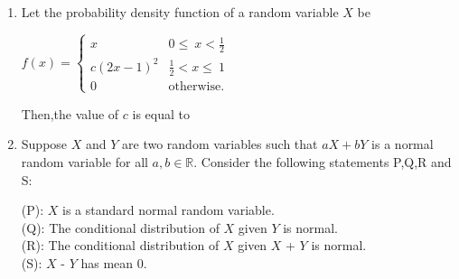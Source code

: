 \documentclass[journal,12pt,twocolumn]{IEEEtran}
\begin{document}
\begin{enumerate}
%
%
%
%
%
%
%
%

\item Let the probability density function of a random variable $X$ be 
\begin{center}
$ 
f(x)=
\begin{cases}
x & 0\leq\ x< \frac{1}{2}\\
c(2x-1)^2 &  \frac{1}{2}<x\leq\ 1\\
0 & \text{otherwise}.
\end{cases}
$\\ 
\end{center}


Then,the value of $c$ is equal to \underline{\hspace{3cm}}
\\
\solution

\item Suppose $X$ and $Y$ are two random variables such that $aX + bY$ is a normal random variable for all $a,b \in \mathbb{R}$. Consider the following statements P,Q,R and S:


 (P): $X$ is a standard normal random variable.\\
 (Q): The conditional distribution of $X$ given $Y$ is normal.\\
 (R): The conditional distribution of $X$ given $X$ + $Y$ is normal.\\
 (S): $X$ - $Y$ has mean $0$.\\


\end{enumerate}
\end{document}

